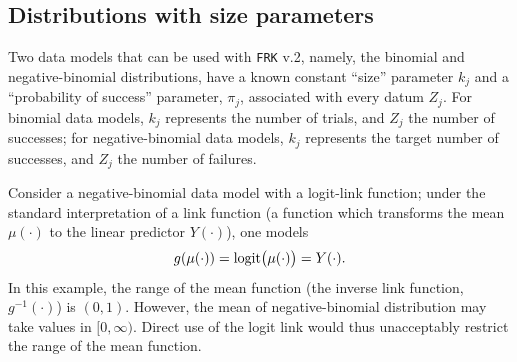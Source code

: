\documentclass[12pt,a4paper]{article}
\begin{document}
\begin{appendices}




\section{Distributions with size parameters}\label{sec:Distributions with size parameters}

Two data models that can be used with \texttt{FRK} v.2, namely, the binomial and negative-binomial distributions, have a known constant ``size'' parameter $k_j$ and a ``probability of success'' parameter, $\pi_j$, associated with every datum $Z_j$.
For binomial data models, $k_j$ represents the number of trials, and $Z_j$ the number of successes; for negative-binomial data models, $k_j$ represents the target number of successes, and $Z_j$ the number of failures. 

Consider a negative-binomial data model with a logit-link function; under the standard interpretation of a link function (a function which transforms the mean $\mu(\cdot)$ to the linear predictor $Y(\cdot)$), one models 
\[
g(\mu(\cdot)) = \text{logit}\!\left(\mu(\cdot)\right) = Y(\cdot).
\]
In this example, the range of the mean function (the inverse link function, $g^{-1}(\cdot)$) is $(0, 1)$.
However, the mean of negative-binomial distribution may take values in $[0, \infty)$. 
Direct use of the logit link would thus unacceptably restrict the range of the mean function.


\end{appendices}
\end{document}
